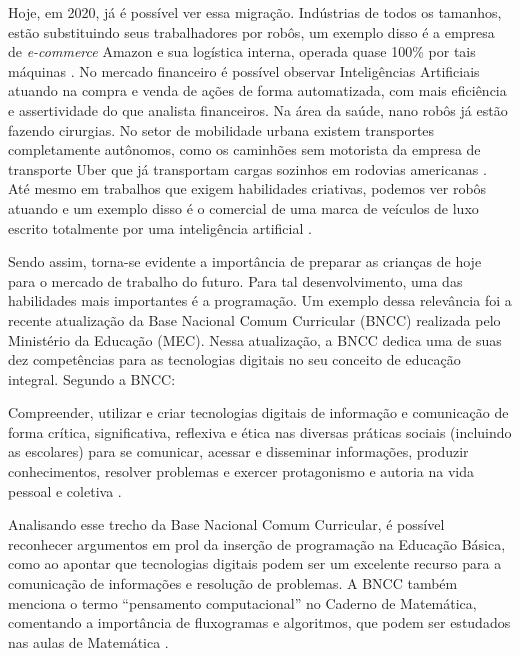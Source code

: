 Hoje, em 2020, já é possível ver essa migração. Indústrias de todos os tamanhos, estão substituindo seus trabalhadores por robôs, um exemplo disso é a empresa de \textit{e-commerce} Amazon e sua logística interna, operada quase 100\% por tais máquinas \cite{winick_2018}. No mercado financeiro é possível observar Inteligências Artificiais atuando na compra e venda de ações de forma automatizada, com mais eficiência e assertividade do que analista financeiros. Na área da saúde, nano robôs já estão fazendo cirurgias. No setor de mobilidade urbana existem transportes completamente autônomos, como os caminhões sem motorista da empresa de transporte Uber que já transportam cargas sozinhos em rodovias americanas \cite{demartini_2016}. Até mesmo em trabalhos que exigem habilidades criativas, podemos ver robôs atuando e um exemplo disso é o comercial de uma marca de veículos de luxo escrito totalmente por uma inteligência artificial \cite{autran_2018}.

Sendo assim, torna-se evidente a importância de preparar as crianças de hoje para o mercado de trabalho do futuro. Para tal desenvolvimento, uma das habilidades mais importantes é a programação. Um exemplo dessa relevância foi a recente atualização da Base Nacional Comum Curricular (BNCC) realizada pelo Ministério da Educação (MEC). Nessa atualização, a BNCC dedica uma de suas dez competências para as tecnologias digitais no seu conceito de educação integral. Segundo a BNCC:

\begin{citacao}

Compreender, utilizar e criar tecnologias digitais de informação e comunicação de forma crítica, significativa, reflexiva e ética nas diversas práticas sociais (incluindo as escolares) para se comunicar, acessar e disseminar informações, produzir conhecimentos, resolver problemas e exercer protagonismo e autoria na vida pessoal e coletiva \cite[p. 9]{bncc_2017}.

\end{citacao}

Analisando esse trecho da Base Nacional Comum Curricular, é possível reconhecer argumentos em prol da inserção de programação na Educação Básica, como ao apontar que tecnologias digitais podem ser um excelente recurso para a comunicação de informações e resolução de problemas. A BNCC também menciona o termo “pensamento computacional” no Caderno de Matemática, comentando a importância de fluxogramas e algoritmos, que podem ser estudados nas aulas de Matemática \cite{bncc_2017}.


